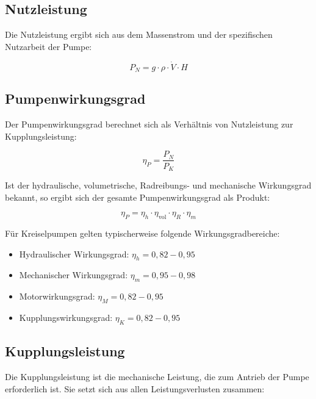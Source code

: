 \subsection{Nutzleistung}

Die Nutzleistung ergibt sich aus dem Massenstrom und der spezifischen Nutzarbeit der Pumpe:

\begin{equation}
	P_N = g \cdot \rho \cdot \dot{V} \cdot H
\end{equation}

\subsection{Pumpenwirkungsgrad}

Der Pumpenwirkungsgrad berechnet sich als Verhältnis von Nutzleistung zur Kupplungsleistung:

\begin{equation}
	\eta_P = \frac{P_N}{P_K}
\end{equation}

Ist der hydraulische, volumetrische, Radreibungs- und mechanische Wirkungsgrad bekannt, so ergibt sich der gesamte Pumpenwirkungsgrad als Produkt:

\begin{equation}
	\eta_P = \eta_h \cdot \eta_{\text{vol}} \cdot \eta_R \cdot \eta_m
\end{equation}

Für Kreiselpumpen gelten typischerweise folgende Wirkungsgradbereiche:

\begin{itemize}
	\item Hydraulischer Wirkungsgrad: \( \eta_h = 0{,}82 - 0{,}95 \)
	\item Mechanischer Wirkungsgrad: \( \eta_m = 0{,}95 - 0{,}98 \)
	\item Motorwirkungsgrad: \( \eta_M = 0{,}82 - 0{,}95 \)
	\item Kupplungswirkungsgrad: \( \eta_K = 0{,}82 - 0{,}95 \)
\end{itemize}

\subsection{Kupplungsleistung}

Die Kupplungsleistung ist die mechanische Leistung, die zum Antrieb der Pumpe erforderlich ist. Sie setzt sich aus allen Leistungsverlusten zusammen:


